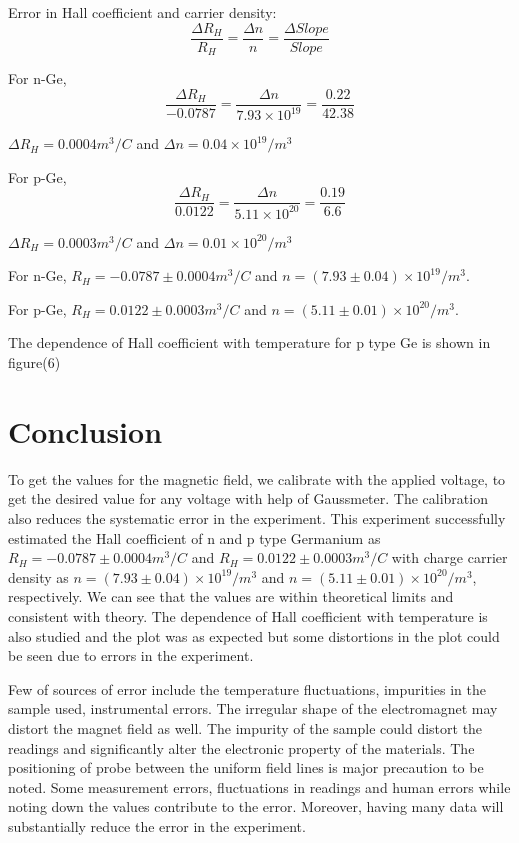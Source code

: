 \documentclass[a4paper, amsfonts, amssymb, amsmath, reprint, showkeys, nofootinbib, twoside]{revtex4-1}
\begin{document}
Error in Hall coefficient and carrier density:
\begin{equation}
	\frac{\Delta R_H}{R_H}=\frac{\Delta n}{n}=\frac{\Delta Slope}{Slope}
\end{equation}

For n-Ge,
\begin{equation}
	\frac{\Delta R_H}{-0.0787}=\frac{\Delta n}{7.93\times10^{19}}=\frac{ 0.22}{42.38}
\end{equation}

$\Delta R_H=0.0004 m^3/C$ and $\Delta n=0.04\times10^{19}/m^3$

For p-Ge,
\begin{equation}
	\frac{\Delta R_H}{0.0122}=\frac{\Delta n}{5.11\times10^{20}}=\frac{ 0.19}{6.6}
\end{equation}

$\Delta R_H=0.0003 m^3/C$ and $\Delta n=0.01\times10^{20}/m^3$

For n-Ge, $R_H=-0.0787\pm0.0004 m^3/C$ and $n=(7.93\pm0.04)\times10^{19}/m^3$.

For p-Ge, $R_H=0.0122\pm0.0003 m^3/C$ and $n=(5.11\pm0.01)\times10^{20}/m^3$.

The dependence of Hall coefficient with temperature for p type Ge is shown in figure(6)

\section{Conclusion}
To get the values for the magnetic field, we calibrate with the applied voltage, to get the desired value for any voltage with help of Gaussmeter. The calibration also reduces the systematic error in the experiment. This experiment successfully estimated the Hall coefficient of n and p type Germanium as $R_H=-0.0787\pm0.0004 m^3/C$ and $R_H=0.0122\pm0.0003 m^3/C$ with charge carrier density as $n=(7.93\pm0.04)\times10^{19}/m^3$ and $n=(5.11\pm0.01)\times10^{20}/m^3$, respectively. We can see that the values are within theoretical limits and consistent with theory. The dependence of Hall coefficient with temperature is also studied and the plot was as expected but some distortions in the plot could be seen due to errors in the experiment.

Few of sources of error include the temperature fluctuations, impurities in the sample used, instrumental errors. The irregular shape of the electromagnet may distort the magnet field as well. The impurity of the sample could distort the readings and significantly alter the electronic property of the materials. The positioning of probe between the uniform field lines is major precaution to be noted. Some measurement errors, fluctuations in readings and human errors while noting down the values contribute to the error. Moreover, having many data will substantially reduce the error in the experiment.
\end{document}

